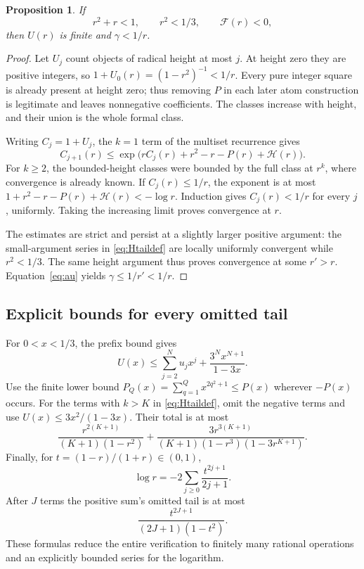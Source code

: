 \documentclass[11pt,letterpaper]{article}
\numberwithin{equation}{section}
\newtheorem{proposition}[theorem]{Proposition}
\theoremstyle{definition}
\begin{document}
\begin{proposition}\label{prop:uppercriterion}
If
\begin{equation}\label{eq:uppercriterion}
 r^2+r<1,\qquad r^2<1/3,\qquad \mathcal F(r)<0,
\end{equation}
then $U(r)$ is finite and $\gamma<1/r$.
\end{proposition}
\begin{proof}
Let $U_j$ count objects of radical height at most $j$.
At height zero they are positive integers, so
$1+U_0(r)=(1-r^2)^{-1}<1/r$.
Every pure integer square is already present at height zero; thus removing
$P$ in each later atom construction is legitimate and leaves nonnegative
coefficients.
The classes increase with height, and their union is the whole formal class.

Writing $C_j=1+U_j$, the $k=1$ term of the multiset recurrence gives
\[
 C_{j+1}(r)\le
 \exp\bigl(rC_j(r)+r^2-r-P(r)+\mathcal H(r)\bigr).
\]
For $k\ge2$, the bounded-height classes were bounded by the full class at
$r^k$, where convergence is already known. If $C_j(r)\le1/r$, the exponent
is at most $1+r^2-r-P(r)+\mathcal H(r)<-\log r$.
Induction gives $C_j(r)<1/r$ for every $j$, uniformly. Taking the increasing
limit proves convergence at $r$.

The estimates are strict and persist at a slightly larger positive argument:
the small-argument series in \eqref{eq:Htaildef} are locally uniformly
convergent while $r^2<1/3$. The same height argument thus proves convergence
at some $r'>r$. Equation~\eqref{eq:au} yields $\gamma\le1/r'<1/r$.
\end{proof}

\subsection{Explicit bounds for every omitted tail}

For $0<x<1/3$, the prefix bound gives
\begin{equation}\label{eq:Utail}
 U(x)\le\sum_{j=2}^{N}u_jx^j
       +\frac{3^N x^{N+1}}{1-3x}.
\end{equation}
Use the finite lower bound
$P_Q(x)=\sum_{q=1}^Qx^{2q^2+1}\le P(x)$ wherever $-P(x)$ occurs.
For the terms with $k>K$ in \eqref{eq:Htaildef}, omit the negative terms and
use $U(x)\le3x^2/(1-3x)$. Their total is at most
\begin{equation}\label{eq:Htailbound}
 \frac{r^{2(K+1)}}{(K+1)(1-r^2)}
 +\frac{3r^{3(K+1)}}{(K+1)(1-r^3)(1-3r^{K+1})}.
\end{equation}
Finally, for $t=(1-r)/(1+r)\in(0,1)$,
\[
 \log r=-2\sum_{j\ge0}\frac{t^{2j+1}}{2j+1}.
\]
After $J$ terms the positive sum's omitted tail is at most
\begin{equation}\label{eq:logtail}
 \frac{t^{2J+1}}{(2J+1)(1-t^2)}.
\end{equation}
These formulas reduce the entire verification to finitely many rational
operations and an explicitly bounded series for the logarithm.
\end{document}
